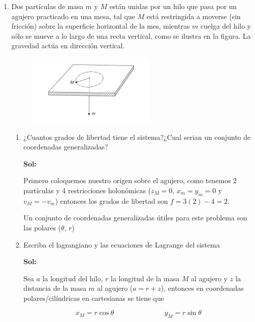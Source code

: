 \documentclass[12pt,a4paper]{article}
\begin{document}
\begin{enumerate}
\begin{enumerate}
\end{enumerate}








\item Dos partículas de masa $m$ y $M$ están unidas por un hilo que pasa por un agujero practicado en una mesa, tal que $M$ está restringida a moverse (sin fricción) sobre la superficie horizontal de la mes, mientras $m$ cuelga del hilo y sólo se mueve a lo largo de una recta vertical, como se ilustra en la figura. La gravedad actúa en dirección vertical.

\begin{figure}[h!]
    \centering
    \includegraphics{2.PNG}
\end{figure}

\begin{enumerate}
    \item ¿Cuantos grados de libertad tiene el sistema?¿Cual serian un conjunto de coordenadas generalizadas?
    
    \textbf{Sol:}
    
    Primero coloquemos nuestro origen sobre el agujero, como tenemos 2 partículas y 4 restricciones holonómicas ($z_M = 0$, $x_m = y_m = 0$ y $v_M = -v_m$) entonces los grados de libertad son  $f= 3(2)-4 = 2$.
    
    Un conjunto de coordenadas generalizadas útiles para este problema son las polares ($\theta$, $r$)
    
    \item Escriba el lagrangiano y las ecuaciones de Lagrange del sistema
    
    \textbf{Sol:}
    
    Sea $a$ la longitud del hilo, $r$ la longitud de la masa $M$ al agujero y $z$ la distancia de la masa $m$ al agujero ($a = r+z$), entonces en coordenadas polares/cilíndricas en cartesianas se tiene que
    
    \begin{equation*}
        x_M = r \cos{\theta}\hspace{3cm} y_M = r \sin{\theta}
    \end{equation*}
    

\end{enumerate}
\end{enumerate}
\end{document}
